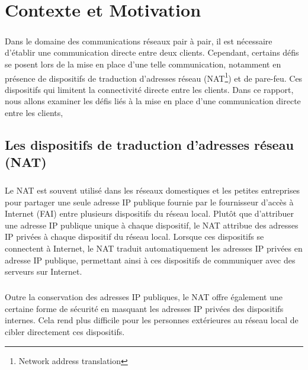 \chapter{Contexte et Motivation}

\paragraph{}
Dans le domaine des communications réseaux pair à pair, il est nécessaire d'établir une communication directe entre deux clients. Cependant, certains défis se 
posent lors de la mise en place d'une telle communication, notamment en présence de dispositifs de traduction d'adresses réseau (NAT\footnote{Network address translation}) et de pare-feu. Ces dispositifs
qui limitent la connectivité directe entre les clients. Dans ce rapport, nous allons examiner les défis liés à la mise en place d'une communication directe entre les clients,

\section{Les dispositifs de traduction d'adresses réseau (NAT)}

\paragraph{}
Le NAT est souvent utilisé dans les réseaux domestiques et les petites entreprises pour partager une seule adresse IP publique fournie par le fournisseur d'accès à Internet (FAI) entre plusieurs dispositifs du réseau local. 
Plutôt que d'attribuer une adresse IP publique unique à chaque dispositif, le NAT attribue des adresses IP privées à chaque dispositif du réseau local. Lorsque ces dispositifs se connectent à Internet, le NAT traduit 
automatiquement les adresses IP privées en adresse IP publique, permettant ainsi à ces dispositifs de communiquer avec des serveurs sur Internet.

\paragraph{}
Outre la conservation des adresses IP publiques, le NAT offre également une certaine forme de sécurité en masquant les adresses IP privées des dispositifs internes. Cela rend plus difficile pour les personnes 
extérieures au réseau local de cibler directement ces dispositifs.

\newpage
